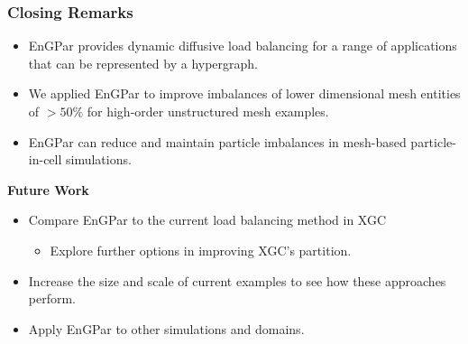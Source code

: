 \documentclass[aspectratio=169]{beamer}
\begin{document}
\begin{frame}
  \frametitle{Closing Remarks}
  \begin{itemize}
  \item EnGPar provides dynamic diffusive load balancing for a range of applications that can be represented by a hypergraph.
  \item We applied EnGPar to  improve imbalances of lower dimensional mesh entities of $>50\%$ for high-order unstructured mesh examples.
  \item EnGPar can reduce and maintain particle imbalances in mesh-based particle-in-cell simulations.
  \end{itemize}
  \textbf{Future Work}
  \begin{itemize}
  \item Compare EnGPar to the current load balancing method in XGC
    \begin{itemize}
    \item Explore further options in improving XGC's partition.
    \end{itemize}
  \item Increase the size and scale of current examples to see how these approaches perform.
  \item Apply EnGPar to other simulations and domains.
  \end{itemize}
\end{frame}
\end{document}
